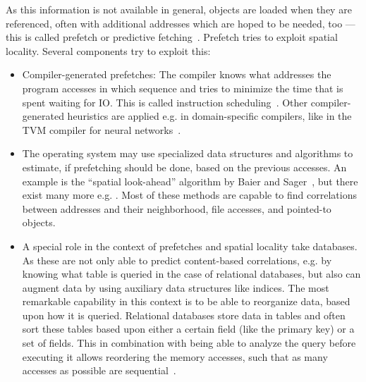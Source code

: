     As this information is not available in general, objects are loaded when they are referenced, often with additional addresses which are hoped to be needed, too --- this is called prefetch or predictive fetching~\autocite{stallings2012operating, jacob2010memory}. 
    Prefetch tries to exploit spatial locality. Several components try to exploit this:
    \begin{itemize}
     \item Compiler-generated prefetches: 
     The compiler knows what addresses the program accesses in which sequence and tries to minimize the time that is spent waiting for IO. 
     This is called instruction scheduling~\autocite{aho1986compilers}. 
     Other compiler-generated heuristics are applied e.g. in domain-specific compilers, like in the TVM compiler for neural networks~\autocite{chen2018tvm}.
     
     \item The operating system may use specialized data structures and algorithms to estimate, if prefetching should be done, based on the previous accesses. 
     An example is the ``spatial look-ahead'' algorithm by Baier and Sager~\autocite{jacob2010memory, baier1976dynamic}, but there exist many more e.g. \autocite{joseph1999prefetching, griffioen1994reducing, kroeger1997exploring, cooksey2002stateless}. 
     Most of these methods are capable to find correlations between addresses and their neighborhood, file accesses, and pointed-to objects.
     
     \item A special role in the context of prefetches and spatial locality take databases. 
     As these are not only able to predict content-based correlations, e.g. by knowing what table is queried in the case of relational databases, but also can augment data by using auxiliary data structures like indices. 
     The most remarkable capability in this context is to be able to reorganize data, based upon how it is queried.
     Relational databases store data in tables and often sort these tables based upon either a certain field (like the primary key) or a set of fields. 
     This in combination with being able to analyze the query before executing it allows reordering the memory accesses, such that as many accesses as possible are sequential~\autocite{ramakrishnan2000database, silberschatz1997database}.
    \end{itemize}
    
